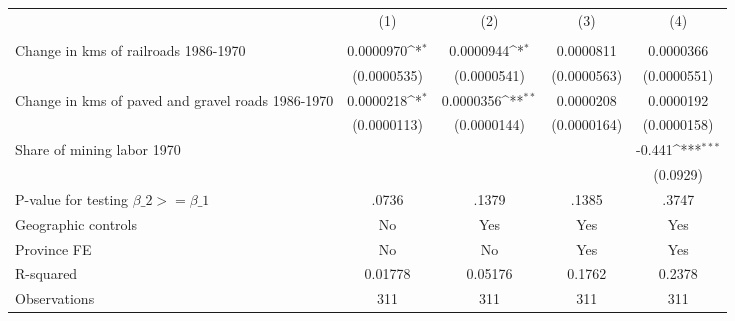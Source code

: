 {
\def\sym#1{\ifmmode^{#1}\else\(^{#1}\)\fi}
\begin{tabular}{l*{4}{c}}
\hline\hline
                &\multicolumn{1}{c}{(1)}&\multicolumn{1}{c}{(2)}&\multicolumn{1}{c}{(3)}&\multicolumn{1}{c}{(4)}\\
                &\multicolumn{1}{c}{}&\multicolumn{1}{c}{}&\multicolumn{1}{c}{}&\multicolumn{1}{c}{}\\
\hline
Change in kms of railroads 1986-1970&0.0000970\sym{*}  &0.0000944\sym{*}  &0.0000811         &0.0000366         \\
                &(0.0000535)         &(0.0000541)         &(0.0000563)         &(0.0000551)         \\
[1em]
Change in kms of paved and gravel roads 1986-1970&0.0000218\sym{*}  &0.0000356\sym{**} &0.0000208         &0.0000192         \\
                &(0.0000113)         &(0.0000144)         &(0.0000164)         &(0.0000158)         \\
[1em]
Share of mining labor 1970&                  &                  &                  &   -0.441\sym{***}\\
                &                  &                  &                  & (0.0929)         \\
\hline
P-value for testing $\beta\_{2} >= \beta\_{1}$&    .0736         &    .1379         &    .1385         &    .3747         \\
Geographic controls&       No         &      Yes         &      Yes         &      Yes         \\
Province FE     &       No         &       No         &      Yes         &      Yes         \\
R-squared       &  0.01778         &  0.05176         &   0.1762         &   0.2378         \\
Observations    &      311         &      311         &      311         &      311         \\
\hline\hline
\end{tabular}
}

